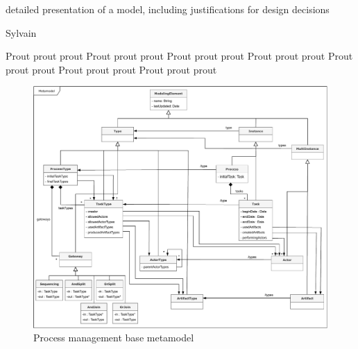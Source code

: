 detailed  presentation of a model, including justifications for design decisions


Sylvain


Prout prout prout Prout prout prout Prout prout prout Prout prout prout Prout prout prout Prout prout prout Prout prout prout 



\begin{figure}
 \centering
    \includegraphics[width=1.0 \textwidth]{Figures/Metamodel.pdf}
    \caption{Process management base metamodel}
    \label{fig:BaseMetamodel}
\end{figure}
